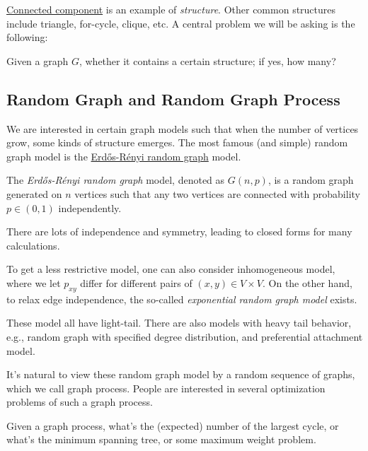 \hyperref[def:connected-component]{Connected component} is an example of \emph{structure}. Other common structures include triangle, for-cycle, clique, etc. A central problem we will be asking is the following:

\begin{problem*}[Property]
	Given a graph \(G\), whether it contains a certain structure; if yes, how many?
\end{problem*}

\subsection{Random Graph and Random Graph Process}
We are interested in certain graph models such that when the number of vertices grow, some kinds of structure emerges. The most famous (and simple) random graph model is the \hyperref[def:Erdős-Rényi-random-graph]{Erdős-Rényi random graph} model.

\begin{definition}\label{def:Erdős-Rényi-random-graph}
	The \emph{Erdős-Rényi random graph} model, denoted as \(G(n, p)\), is a random graph generated on \(n\) vertices such that any two vertices are connected with probability \(p \in (0, 1)\) independently.
\end{definition}

\begin{note}
	There are lots of independence and symmetry, leading to closed forms for many calculations.
\end{note}

To get a less restrictive model, one can also consider inhomogeneous model, where we let \(p_{xy}\) differ for different pairs of \((x , y) \in V \times V\). On the other hand,  to relax edge independence, the so-called \emph{exponential random graph model} exists.

\begin{remark}
	These model all have light-tail. There are also models with heavy tail behavior, e.g., random graph with specified degree distribution, and preferential attachment model.
\end{remark}

It's natural to view these random graph model by a random sequence of graphs, which we call graph process. People are interested in several optimization problems of such a graph process.

\begin{eg}
	Given a graph process, what's the (expected) number of the largest cycle, or what's the minimum spanning tree, or some maximum weight problem.
\end{eg}

